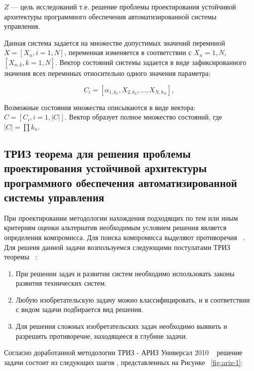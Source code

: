 $Z$ — цель исследований т.е. решение проблемы проектирования устойчивой архитектуры программного обеспечения автоматизированной системы управления.

Данная система задается на множестве допустимых значений перемнной $ X = [X_{n}, i={1,N}] $, переменная изменяется в соответствии с $ X_{n} ={1,N}$, $[X_{n, k}, k = {1,N}]$. Вектор состояний системы задается в виде зафиксированного значения всех перемнных относительно одного значения параметра:

\begin{equation}
    \label{eq:equation30}
    C_{i} = [\alpha_{1,k_{1}}, X_{2,k_{2}}, ..., X_{N, k_{N}}] ,
\end{equation}

Возможные состояния множества описываются в виде вектора: $ C = [C_{i} , i={1,|C|}]$. Вектор образует полное множество состояний, 
где $|C| = \prod k_n$.

\subsection{ТРИЗ теорема для решения проблемы проектирования устойчивой архитектуры программного обеспечения автоматизированной системы управления}\label{sec:ch2/sec2/sub1}

При проектировании методологии нахождения подходящих по тем или иным критериям оценки альтернатив необходимым условием решения является определения компромисса. Для поиска компромисса выделяют противоречия ~\cite{trisonlinepetrov}. Для решеия данной задачи возпользуемся следующими постулатами ТРИЗ теоремы ~\cite{trisonlinepetrov, altshuller}:

\begin{enumerate}
	\item При решении задач и развитии систем необходимо использовать законы развития технических систем.
	\item  Любую изобретательскую задачу можно классифицировать, и в соответствии с видом задачи подбирается вид решения.
	\item  Для решения сложных изобретательских задач необходимо выявить и разрешить противоречие, находящееся в глубине задачи.
\end{enumerate}

Согласно доработанной методологии ТРИЗ - АРИЗ Универсал 2010 ~\cite{ariz-2010} решение задачи состоит из следующих шагов , представленных на Рисунке ~\cref{fig:ariz-1}:

